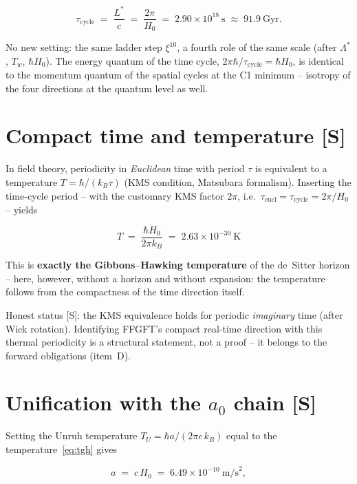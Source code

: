 \documentclass[11pt]{report}
\begin{document}
\begin{equation}
  \tau_\text{cycle} \;=\; \frac{L^{*}}{c}
  \;=\; \frac{2\pi}{H_0}
  \;=\; 2.90\times10^{18}~\text{s}
  \;\approx\; 91.9~\text{Gyr}.
  \label{eq:tauzyk}
\end{equation}

No new setting: the same ladder step $\xi^{10}$, a fourth role of
the same scale (after $\Lambda^{*}$, $T_w$, $\hbar H_0$). The
energy quantum of the time cycle, $2\pi\hbar/\tau_\text{cycle}
= \hbar H_0$, is identical to the momentum quantum of the spatial
cycles at the C1 minimum -- isotropy of the four directions at the
quantum level as well.

\section{Compact time and temperature [S]}

In field theory, periodicity in \emph{Euclidean} time with period
$\tau$ is equivalent to a temperature $T = \hbar/(k_B\tau)$ (KMS
condition, Matsubara formalism). Inserting the time-cycle period --
with the customary KMS factor $2\pi$, i.e.\
$\tau_\text{eucl} = \tau_\text{cycle} = 2\pi/H_0$ -- yields

\begin{equation}
  \boxed{\;T \;=\; \frac{\hbar H_0}{2\pi k_B}
  \;=\; 2.63\times10^{-30}~\text{K}\;}
  \label{eq:tgh}
\end{equation}

This is \textbf{exactly the Gibbons--Hawking temperature} of the
de~Sitter horizon -- here, however, without a horizon and without
expansion: the temperature follows from the compactness of the time
direction itself.

Honest status [S]: the KMS equivalence holds for periodic
\emph{imaginary} time (after Wick rotation). Identifying FFGFT's
compact real-time direction with this thermal periodicity is a
structural statement, not a proof -- it belongs to the forward
obligations (item~D).

\section{Unification with the $a_0$ chain [S]}

Setting the Unruh temperature $T_U = \hbar a/(2\pi c\,k_B)$ equal
to the temperature~\eqref{eq:tgh} gives

\begin{equation}
  a \;=\; c\,H_0 \;=\; 6.49\times10^{-10}~\text{m/s}^2,
\end{equation}
\end{document}

